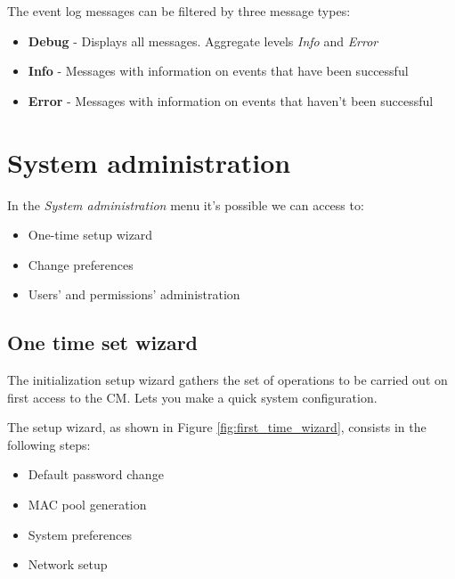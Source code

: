 The event log messages can be filtered by three message types:
\begin{itemize}
    \item {\bf Debug} - Displays all messages. Aggregate levels \emph{Info} and \emph{Error}
    \item {\bf Info} - Messages with information on events that have been successful
    \item {\bf Error} - Messages with information on events that haven't been successful
\end{itemize}

\section{System administration}
\label{sec:first_time_wizard}
In the \emph{System administration} menu it's possible we can access to:
\begin{itemize}
\item One-time setup wizard
\item Change preferences
\item Users' and permissions' administration
\end{itemize}

\subsection{One time set wizard}
The initialization setup wizard gathers the set of operations to be carried out on first access to the CM. Lets you make a quick system configuration.

The setup wizard, as shown in Figure \ref{fig:first_time_wizard}, consists in the following steps:

\begin{itemize}
	\item Default password change
	\item MAC pool generation
    \item System preferences
	\item Network setup
\end{itemize}


